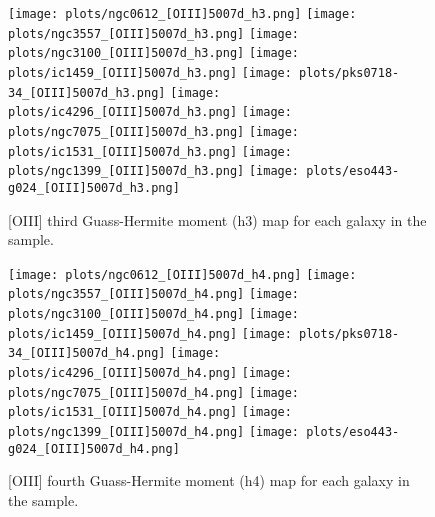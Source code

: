 \documentclass[fleqn,usenatbib,useAMS]{mnras}
\begin{document}
        \begin{figure*}
            \centering
            \texttt{[image: plots/ngc0612\_[OIII]5007d\_h3.png]}
            \texttt{[image: plots/ngc3557\_[OIII]5007d\_h3.png]}
            \texttt{[image: plots/ngc3100\_[OIII]5007d\_h3.png]}
            \texttt{[image: plots/ic1459\_[OIII]5007d\_h3.png]}
            \texttt{[image: plots/pks0718-34\_[OIII]5007d\_h3.png]}
            \texttt{[image: plots/ic4296\_[OIII]5007d\_h3.png]}
            \texttt{[image: plots/ngc7075\_[OIII]5007d\_h3.png]}
            \texttt{[image: plots/ic1531\_[OIII]5007d\_h3.png]}
            \texttt{[image: plots/ngc1399\_[OIII]5007d\_h3.png]}
            \texttt{[image: plots/eso443-g024\_[OIII]5007d\_h3.png]}
            \caption{[OIII] third Guass-Hermite moment (h3) map for each galaxy in the sample.}
            \label{fig:OIII_h3}
        \end{figure*}


        \begin{figure*}
            \centering
            \texttt{[image: plots/ngc0612\_[OIII]5007d\_h4.png]}
            \texttt{[image: plots/ngc3557\_[OIII]5007d\_h4.png]}
            \texttt{[image: plots/ngc3100\_[OIII]5007d\_h4.png]}
            \texttt{[image: plots/ic1459\_[OIII]5007d\_h4.png]}
            \texttt{[image: plots/pks0718-34\_[OIII]5007d\_h4.png]}
            \texttt{[image: plots/ic4296\_[OIII]5007d\_h4.png]}
            \texttt{[image: plots/ngc7075\_[OIII]5007d\_h4.png]}
            \texttt{[image: plots/ic1531\_[OIII]5007d\_h4.png]}
            \texttt{[image: plots/ngc1399\_[OIII]5007d\_h4.png]}
            \texttt{[image: plots/eso443-g024\_[OIII]5007d\_h4.png]}
            \caption{[OIII] fourth Guass-Hermite moment (h4) map for each galaxy in the sample.}
            \label{fig:OIII_h4}
        \end{figure*}
\end{document}
